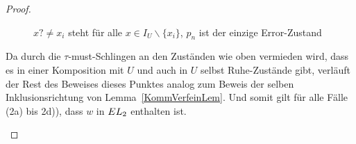 \begin{proof}
\begin{itemize}
\begin{figure} [h!tbp]
\begin{center}
        \caption{$x?\neq x_i$ steht für alle $x\in I_U\backslash\{x_i\}$, $p_n$
          ist der einzige Error-Zustand}
      \label{UmitEundTau}
      \end{center}
      \end{figure}
      Da durch die $\tau$-must-Schlingen an den Zuständen wie oben vermieden wird,
      dass es in einer Komposition mit $U$ und auch in $U$ selbst Ruhe-Zustände
      gibt, verläuft der Rest des Beweises dieses Punktes analog zum Beweis der
      selben Inklusionsrichtung von Lemma~\ref{KommVerfeinLem}. Und somit gilt
      für alle Fälle (2a) bis 2d)), dass $w$ in $EL _2$ enthalten ist.
  \end{itemize}


\end{proof}
